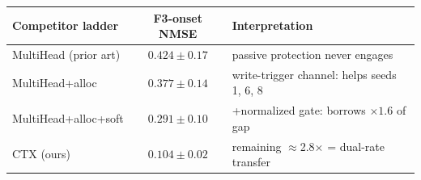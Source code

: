 \begin{tabular}{lcl}
\toprule
Competitor ladder & F3-onset NMSE & Interpretation \\
\midrule
MultiHead (prior art) & $0.424\pm0.17$ & passive protection never engages \\
MultiHead+alloc & $0.377\pm0.14$ & write-trigger channel: helps seeds 1, 6, 8 \\
MultiHead+alloc+soft & $0.291\pm0.10$ & +normalized gate: borrows $\times1.6$ of gap \\
CTX (ours) & $\mathbf{0.104\pm0.02}$ & remaining $\approx$2.8$\times$ = dual-rate transfer \\
\bottomrule
\end{tabular}